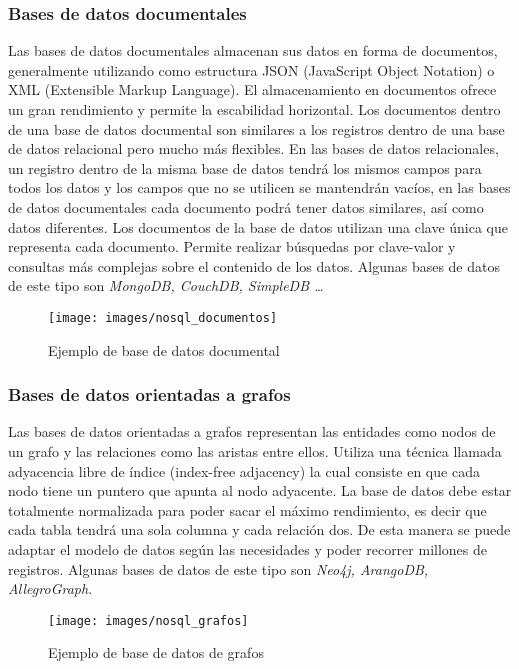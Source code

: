 \subsubsection{Bases de datos documentales}

Las bases de datos documentales almacenan sus datos en forma de documentos, generalmente
utilizando como estructura JSON (JavaScript Object Notation) o XML (Extensible Markup
Language). El almacenamiento en documentos ofrece un gran rendimiento y permite la escabilidad
horizontal. Los documentos dentro de una base de datos documental son similares a los registros
dentro de una base de datos relacional pero mucho más flexibles. En las bases de datos relacionales,
un registro dentro de la misma base de datos tendrá los mismos campos para todos los datos y los
campos que no se utilicen se mantendrán vacíos, en las bases de datos documentales cada
documento podrá tener datos similares, así como datos diferentes. Los documentos de la base de
datos utilizan una clave única que representa cada documento. Permite realizar búsquedas por
clave-valor y consultas más complejas sobre el contenido de los datos. Algunas bases de datos de
este tipo son \textit{MongoDB, CouchDB, SimpleDB \ldots}

\begin{figure}[!h]
	\centering
	\texttt{[image: images/nosql\_documentos]}
	\caption{Ejemplo de base de datos documental}
	\label{fig:nosql_documental}
\end{figure}

\subsubsection{Bases de datos orientadas a grafos}

Las bases de datos orientadas a grafos representan las entidades como nodos de un grafo y las relaciones como las aristas entre ellos. Utiliza una técnica llamada adyacencia libre de índice (index-free  adjacency) la cual consiste en que cada nodo tiene un puntero que apunta al nodo adyacente.  La  base  de  datos  debe  estar  totalmente  normalizada  para  poder  sacar  el  máximo rendimiento, es decir que cada tabla tendrá una sola columna y cada relación dos. De esta manera se puede adaptar el modelo de datos según las necesidades y poder recorrer millones de registros. Algunas bases de datos de este tipo son \textit{Neo4j, ArangoDB, AllegroGraph}.

\begin{figure}[!h]
	\centering
	\texttt{[image: images/nosql\_grafos]}
	\caption{Ejemplo de base de datos de grafos}
	\label{fig:nosql_grafos}
\end{figure}

